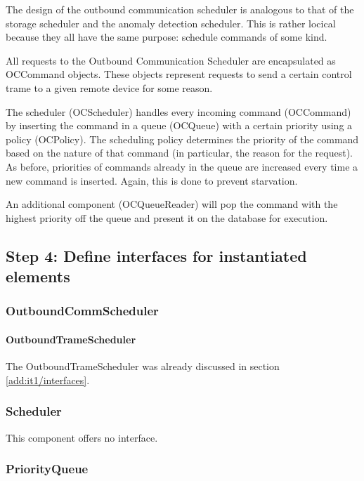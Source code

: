 \npar The design of the outbound communication scheduler is analogous to that
of the storage scheduler and the anomaly detection scheduler. This is rather
locical because they all have the same purpose: schedule commands of some kind.

\npar All requests to the Outbound Communication Scheduler are encapsulated as
OCCommand objects. These objects represent requests to send a certain control
trame to a given remote device for some reason. 

\npar The scheduler (OCScheduler) handles every incoming command
(OCCommand) by inserting the command in a queue (OCQueue) with a
certain priority using a policy (OCPolicy). The scheduling policy
determines the priority of the command based on the nature of that command
(in particular, the reason for the request). As before, priorities of commands
already in the queue are increased every time a new command is inserted.
Again, this is done to prevent starvation.

\npar An additional component (OCQueueReader) will pop the command with the
highest priority off the queue and present it on the database for execution.

\subsection{Step 4: Define interfaces for instantiated elements}
\label{add:it6/interfaces}

\subsubsection{OutboundCommScheduler}

\paragraph{OutboundTrameScheduler}

\npar The OutboundTrameScheduler was already discussed in section
\ref{add:it1/interfaces}.

\subsubsection{Scheduler}

\npar This component offers no interface.

\subsubsection{PriorityQueue}

